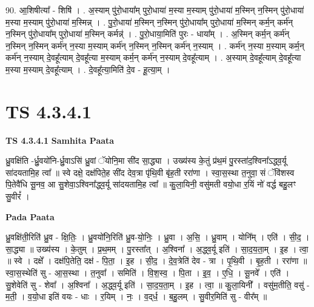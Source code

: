 \documentclass[17pt]{extarticle}
\begin{document}
90. आ॒शिषीत्या᳚ - शिषि॑ । . अ॒स्याम् पु॑रो॒धाया᳚म् पुरो॒धाया॑ म॒स्या म॒स्याम् पु॑रो॒धाया॑ म॒स्मिन् न॒स्मिन् पु॑रो॒धाया॑ म॒स्या म॒स्याम् पु॑रो॒धाया॑ म॒स्मिन्न् । . पु॒रो॒धाया॑ म॒स्मिन् न॒स्मिन् पु॑रो॒धाया᳚म् पुरो॒धाया॑ म॒स्मिन् कर्म॒न् कर्म॑न् न॒स्मिन् पु॑रो॒धाया᳚म् पुरो॒धाया॑ म॒स्मिन् कर्मन्न्॑ । . पु॒रो॒धाया॒मिति॑ पुरः - धाया᳚म् । . अ॒स्मिन् कर्म॒न् कर्म॑न् न॒स्मिन् न॒स्मिन् कर्म॑न् न॒स्या म॒स्याम् कर्म॑न् न॒स्मिन् न॒स्मिन् कर्म॑न् न॒स्याम् । . कर्म॑न् न॒स्या म॒स्याम् कर्म॒न् कर्म॑न् न॒स्याम् दे॒वहू᳚त्याम् दे॒वहू᳚त्या म॒स्याम् कर्म॒न् कर्म॑न् न॒स्याम् दे॒वहू᳚त्याम् । . अ॒स्याम् दे॒वहू᳚त्याम् दे॒वहू᳚त्या म॒स्या म॒स्याम् दे॒वहू᳚त्याम् । . दे॒वहू᳚त्या॒मिति॑ दे॒व - हू॒त्या॒म् । \newline
\pagebreak
{}

\section{ TS 4.3.4.1 }

\textbf{TS 4.3.4.1 } \newline
\textbf{Samhita Paata} \newline

ध्रु॒वक्षि॑ति -र्ध्रु॒वयो॑नि-र्ध्रु॒वाऽसि॑ ध्रु॒वां ॅयोनि॒मा सी॑द सा॒द्ध्या । उख्य॑स्य के॒तुं प्र॑थ॒मं पु॒रस्ता॑द॒श्विना᳚ऽद्ध्व॒र्यू सा॑दयतामि॒ह त्वा᳚ ॥ स्वे दक्षे॒ दक्ष॑पिते॒ह सी॑द देव॒त्रा पृ॑थि॒वी बृ॑ह॒ती ररा॑णा । स्वा॒स॒स्था त॒नुवा॒ सं ॅवि॑शस्व पि॒तेवै॑धि सू॒नव॒ आ सु॒शेवा॒ऽश्विना᳚द्ध्व॒र्यू सा॑दयतामि॒ह त्वा᳚ ॥ कु॒ला॒यिनी॒ वसु॑मती वयो॒धा र॒यिं नो॑ वर्द्ध बहु॒लꣳ सु॒वीरं᳚ । \newline

\textbf{Pada Paata} \newline

ध्रु॒वक्षि॑ती॒रिति॑ ध्रु॒व - क्षि॒तिः॒ । ध्रु॒वयो॑नि॒रिति॑ ध्रु॒व-यो॒निः॒ । ध्रु॒वा । अ॒सि॒ । ध्रु॒वाम् । योनि᳚म् । एति॑ । सी॒द॒ । सा॒द्ध्या ॥ उख्य॑स्य । के॒तुम् । प्र॒थ॒मम् । पु॒रस्ता᳚त् । अ॒श्विना᳚ । अ॒द्ध्व॒र्यू इति॑ । सा॒द॒य॒ता॒म् । इ॒ह । त्वा॒ ॥ स्वे । दक्षे᳚ । दक्ष॑पि॒तेति॒ दक्ष॑ - पि॒ता॒ । इ॒ह । सी॒द॒ । दे॒व॒त्रेति॑ देव - त्रा । पृ॒थि॒वी । बृ॒ह॒ती । ररा॑णा ॥ स्वा॒स॒स्थेति॑ सु - आ॒स॒स्था । त॒नुवा᳚ । समिति॑ । वि॒श॒स्व॒ । पि॒ता । इ॒व॒ । ए॒धि॒ । सू॒नवे᳚ । एति॑ । सु॒शेवेति॑ सु - शेवा᳚ । अ॒श्विना᳚ । अ॒द्ध्व॒र्यू इति॑ । सा॒द॒य॒ता॒म् । इ॒ह । त्वा॒ ॥ कु॒ला॒यिनी᳚ । वसु॑म॒तीति॒ वसु॑ - म॒ती॒ । व॒यो॒धा इति॑ वयः - धाः । र॒यिम् । नः॒ । व॒द्‌र्ध॒ । ब॒हु॒लम् । सु॒वीर॒मिति॑ सु - वीर᳚म् ॥  \newline
\end{document}
